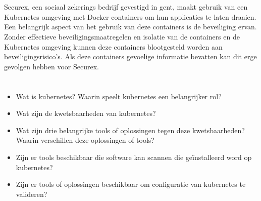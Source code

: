 \section{}%
\label{sec:probleemstelling}

Securex, een sociaal zekerings bedrijf gevestigd in gent, maakt gebruik van een Kubernetes omgeving met Docker containers om hun applicaties te laten draaien. Een belangrijk aspect van het gebruik van deze containers is de beveiliging ervan. Zonder effectieve beveiligingsmaatregelen en isolatie van de containers en de Kubernetes omgeving kunnen deze containers blootgesteld worden aan beveiligingsrisico's. Als deze containers gevoelige informatie bevatten kan dit erge gevolgen hebben voor Securex.


\section{}%
\label{sec:onderzoeksvraag}

\begin{itemize}
    \item Wat is kubernetes? Waarin speelt kubernetes een belangrijker rol?
    \item Wat zijn de kwetsbaarheden van kubernetes?
    \item Wat zijn drie belangrijke tools of oplossingen tegen deze kwetsbaarheden? Waarin verschillen deze oplossingen of tools?
    \item Zijn er tools beschikbaar die software kan scannen die geïnstalleerd word op kubernetes?
    \item Zijn er tools of oplossingen beschikbaar om configuratie van kubernetes te valideren?
\end{itemize}

